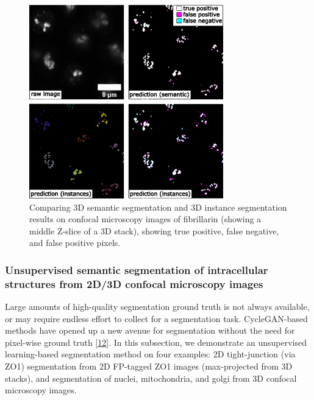 \begin{figure}
\hypertarget{fig:3dseg}{%
\centering
\includegraphics[width=0.75\textwidth,height=\textheight]{images/semantic_seg3d_justin.png}
\caption{Comparing 3D semantic segmentation and 3D instance segmentation results on confocal microscopy images of fibrillarin (showing a middle Z-slice of a 3D stack), showing true positive, false negative, and false positive pixels.}\label{fig:3dseg}
}
\end{figure}

\hypertarget{unsupervised-semantic-segmentation-of-intracellular-structures-from-2d3d-confocal-microscopy-images}{%
\subsubsection{Unsupervised semantic segmentation of intracellular structures from 2D/3D confocal microscopy images}\label{unsupervised-semantic-segmentation-of-intracellular-structures-from-2d3d-confocal-microscopy-images}}

Large amounts of high-quality segmentation ground truth is not always available, or may require endless effort to collect for a segmentation task. CycleGAN-based methods have opened up a new avenue for segmentation without the need for pixel-wise ground truth {[}\protect\hyperlink{ref-RuFP3CS3}{12}{]}. In this subsection, we demonstrate an unsupervised learning-based segmentation method on four examples: 2D tight-junction (via ZO1) segmentation from 2D FP-tagged ZO1 images (max-projected from 3D stacks), and segmentation of nuclei, mitochondria, and golgi from 3D confocal microscopy images.

